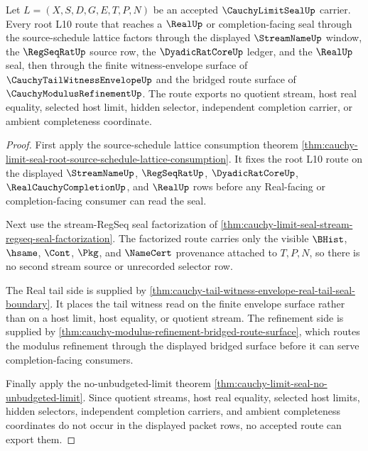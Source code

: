 \begin{theorem}
\label{thm:cauchy-limit-seal-root-envelope-refinement-exhaustion}
Let $L=(X,S,D,G,E,T,P,N)$ be an accepted $\CauchyLimitSealUp$ carrier. Every root L10 route that reaches a $\RealUp$ or completion-facing seal through the source-schedule lattice factors through the displayed $\StreamNameUp$ window, the $\RegSeqRatUp$ source row, the $\DyadicRatCoreUp$ ledger, and the $\RealUp$ seal, then through the finite witness-envelope surface of $\CauchyTailWitnessEnvelopeUp$ and the bridged route surface of $\CauchyModulusRefinementUp$. The route exports no quotient stream, host real equality, selected host limit, hidden selector, independent completion carrier, or ambient completeness coordinate.
\end{theorem}
\begin{proof}
First apply the source-schedule lattice consumption theorem \autoref{thm:cauchy-limit-seal-root-source-schedule-lattice-consumption}. It fixes the root L10 route on the displayed $\StreamNameUp$, $\RegSeqRatUp$, $\DyadicRatCoreUp$, $\RealCauchyCompletionUp$, and $\RealUp$ rows before any Real-facing or completion-facing consumer can read the seal.

Next use the stream-RegSeq seal factorization of \autoref{thm:cauchy-limit-seal-stream-regseq-seal-factorization}. The factorized route carries only the visible $\BHist$, $\hsame$, $\Cont$, $\Pkg$, and $\NameCert$ provenance attached to $T,P,N$, so there is no second stream source or unrecorded selector row.

The Real tail side is supplied by \autoref{thm:cauchy-tail-witness-envelope-real-tail-seal-boundary}. It places the tail witness read on the finite envelope surface rather than on a host limit, host equality, or quotient stream. The refinement side is supplied by \autoref{thm:cauchy-modulus-refinement-bridged-route-surface}, which routes the modulus refinement through the displayed bridged surface before it can serve completion-facing consumers.

Finally apply the no-unbudgeted-limit theorem \autoref{thm:cauchy-limit-seal-no-unbudgeted-limit}. Since quotient streams, host real equality, selected host limits, hidden selectors, independent completion carriers, and ambient completeness coordinates do not occur in the displayed packet rows, no accepted route can export them.
\end{proof}

